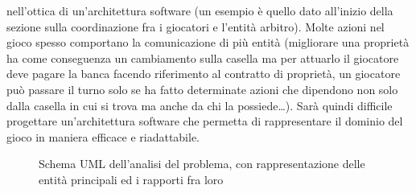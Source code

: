 nell'ottica di un'architettura software (un esempio è quello dato all'inizio della sezione sulla coordinazione fra i giocatori e 
l'entità arbitro). Molte azioni nel gioco spesso comportano la comunicazione di più entità (migliorare una
proprietà ha come conseguenza un cambiamento sulla casella ma per attuarlo il giocatore deve pagare la banca facendo riferimento
al contratto di proprietà, un giocatore può passare il turno solo se ha fatto determinate azioni che dipendono non solo dalla casella in cui
si trova ma anche da chi la possiede\dots). 
Sarà quindi difficile progettare un'architettura software che permetta di rappresentare il dominio del gioco
in maniera efficace e riadattabile. 


\begin{figure}[H]
    \centering
    \caption{Schema UML dell'analisi del problema, con rappresentazione delle entità principali ed i rapporti fra loro}
	\label{img:entity_diagram}
\end{figure}
